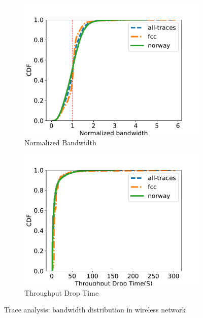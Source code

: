 \begin{figure}[htb]
\centering
\begin{subfigure}[b]{.45\columnwidth}
\centering
\includegraphics[width=\textwidth]{fig/trace.pdf}
\caption{Normalized Bandwidth}
\label{fig:trace}
\end{subfigure}
\begin{subfigure}[b]{.45\columnwidth}
\centering
\includegraphics[width=\textwidth]{fig/trace-down.pdf}
\caption{Throughput Drop Time}
\label{fig:trace-down}
\end{subfigure}
\caption{Trace analysis: bandwidth distribution in wireless network}
\label{fig:trace-all}
\end{figure}

